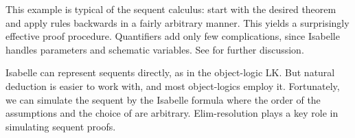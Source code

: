 \begin{isabellebody}
\begin{isamarkuptext}
  This example is typical of the sequent calculus: start with the
  desired theorem and apply rules backwards in a fairly arbitrary
  manner.  This yields a surprisingly effective proof procedure.
  Quantifiers add only few complications, since Isabelle handles
  parameters and schematic variables.  See \cite[Chapter
  10]{paulson-ml2} for further discussion.%
\end{isamarkuptext}%
\isamarkuptrue%
%
\isamarkuptrue%
%
\begin{isamarkuptext}%
Isabelle can represent sequents directly, as in the
  object-logic LK.  But natural deduction is easier to work with, and
  most object-logics employ it.  Fortunately, we can simulate the
  sequent  by the Isabelle formula
   where the order of
  the assumptions and the choice of  are arbitrary.
  Elim-resolution plays a key role in simulating sequent proofs.


\end{isamarkuptext}
\end{isabellebody}

